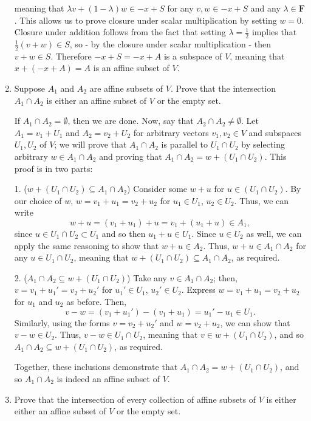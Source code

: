 \documentclass{book}
\begin{document}
\begin{enumerate}
meaning that \(\lambda v + (1-\lambda)w \in -x + S\) for any \(v, w \in -x+S\) and any \(\lambda \in \textbf{F}\).  This allows us to prove closure under scalar multiplication by setting \(w=0\).  Closure under addition follows from the fact that setting \(\lambda = \frac{1}{2}\) implies that \(\frac{1}{2}(v+w) \in S\), so - by the closure under scalar multiplication - then \(v + w \in S\).  Therefore \(-x+S=-x+A\) is a subspace of \(V\), meaning that \(x+(-x+A)=A\) is an affine subset of \(V\).

\item Suppose \(A_1\) and \(A_2\) are affine subsets of \(V\).  Prove that the intersection \(A_1 \cap A_2\) is either an affine subset of \(V\) or the empty set.

If \(A_1 \cap A_2 = \emptyset\), then we are done.  Now, say that \(A_2 \cap A_2 \neq \emptyset\).  Let \(A_1=v_1+U_1\) and \(A_2=v_2+U_2\) for arbitrary vectors \(v_1,v_2 \in V\) and subspaces \(U_1,U_2\) of \(V\); we will prove that \(A_1 \cap A_2\) is parallel to \(U_1 \cap U_2\) by selecting arbitrary \(w \in A_1 \cap A_2\) and proving that \(A_1 \cap A_2=w+(U_1 \cap U_2)\).  This proof is in two parts:

1.  (\(w+(U_1 \cap U_2) \subseteq A_1 \cap A_2\)) Consider some \(w+u\) for \(u \in (U_1 \cap U_2)\).  By our choice of \(w\), \(w=v_1+u_1=v_2+u_2\) for \(u_1 \in U_1\), \(u_2 \in U_2\).  Thus, we can write \[w+u=(v_1+u_1)+u=v_1+(u_1+u) \in A_1,\] since \(u \in U_1 \cap U_2 \subset U_1\) and so then \(u_1+u \in U_1\).  Since \(u \in U_2\) as well, we can apply the same reasoning to show that \(w+u \in A_2\).  Thus, \(w+u \in A_1 \cap A_2\) for any \(u \in U_1 \cap U_2\), meaning that \(w+(U_1 \cap U_2) \subseteq A_1 \cap A_2\), as required.

2.  (\(A_1 \cap A_2 \subseteq w+(U_1 \cap U_2)\)) Take any \(v \in A_1 \cap A_2\); then, \(v=v_1+u_1'=v_2+u_2'\) for \(u_1' \in U_1\), \(u_2' \in U_2\).  Express \(w=v_1+u_1=v_2+u_2\) for \(u_1\) and \(u_2\) as before.  Then, \[v-w=(v_1+u_1')-(v_1+u_1)=u_1'-u_1 \in U_1.\] Similarly, using the forms \(v=v_2+u_2'\) and \(w=v_2+u_2\), we can show that \(v-w \in U_2\).  Thus, \(v-w \in U_1 \cap U_2\), meaning that \(v \in w+(U_1 \cap U_2)\), and so \(A_1 \cap A_2 \subseteq w+(U_1 \cap U_2)\), as required.

Together, these inclusions demonstrate that \(A_1 \cap A_2=w+(U_1 \cap U_2)\), and so \(A_1 \cap A_2\) is indeed an affine subset of \(V\).

\item Prove that the intersection of every collection of affine subsets of \(V\) is either either an affine subset of \(V\) or the empty set.  


\end{enumerate}
\end{document}

